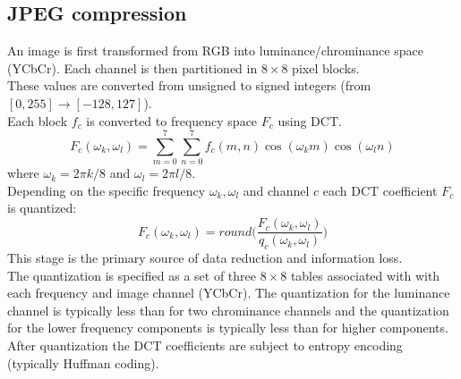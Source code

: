 \documentclass[10pt,a4paper]{book}
\begin{document}
\subsection{JPEG compression}
An image is first transformed from RGB into luminance/chrominance space (YCbCr). Each channel is then partitioned in $8 \times 8$ pixel blocks.\\
These values are converted from unsigned to signed integers (from $[0,255]\to [-128,127]$).\\
Each block $f_c$ is converted to frequency space $F_c$ using DCT.
$$ F_c(\omega_k,\omega_l) = \sum_{m=0}^7\sum_{n=0}^7 f_c(m,n)\cos(\omega_k m)\cos(\omega_l n)$$
where $\omega_k=2\pi k/8$ and $\omega_l=2 \pi l / 8$.\\
Depending on the specific frequency $\omega_k,\omega_l$ and channel $c$ each DCT coefficient $F_c$ is quantized:
$$ F_c(\omega_k,\omega_l) = round \bigg( \frac{F_c(\omega_k,\omega_l)}{q_c(\omega_k,\omega_l)}\bigg )$$
This stage is the primary source of data reduction and information loss.\\
The quantization is specified as a set of three $8 \times 8$ tables associated with with each frequency and image channel (YCbCr). The quantization for the luminance channel is typically less than for two chrominance channels and the quantization for the lower frequency components is typically less than for higher components.\\
After quantization the DCT coefficients are subject to entropy encoding (typically Huffman coding).
\end{document}

